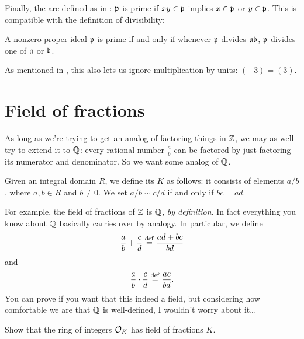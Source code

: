 Finally, the  are defined as in :
$\pp$ is prime if $xy \in \pp$ implies $x \in \pp$ or $y \in \pp$.
This is compatible with the definition of divisibility:
\begin{exercise}
	A nonzero proper ideal $\pp$ is prime
	if and only if whenever $\pp$ divides $\aa \bb$,
	$\pp$ divides one of $\aa$ or $\bb$.
\end{exercise}
As mentioned in ,
this also lets us ignore multiplication by units: $(-3) = (3)$.

\section{Field of fractions}
As long as we're trying to get an analog of factoring things in $\ZZ$,
we may as well try to extend it to $\QQ$: every rational number $\frac ab$ can be
factored by just factoring its numerator and denominator.
So we want some analog of $\QQ$.

Given an integral domain $R$, we define its  $K$ as follows:
it consists of elements $a / b$, where $a,b \in R$ and $b \neq 0$.
We set $a / b \sim c / d$ if and only if $bc = ad$.

For example, the field of fractions of $\ZZ$ is $\QQ$, \emph{by definition}.
In fact everything you know about $\QQ$ basically carries over by analogy.
In particular, we define
\[ \frac ab + \frac cd \defeq \frac{ad+bc}{bd} \]
and
\[ \frac ab \cdot \frac cd \defeq \frac{ac}{bd}. \]
You can prove if you want that this indeed a field, but 
considering how comfortable we are that $\QQ$ is well-defined,
I wouldn't worry about it\dots

\begin{ques}
	Show that the ring of integers $\OO_K$ has field of fractions $K$.
\end{ques}

